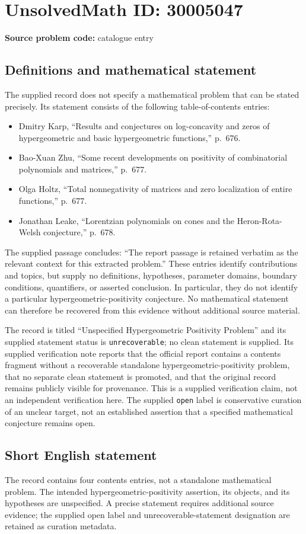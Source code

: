 \documentclass[11pt]{article}
\begin{document}
\section*{UnsolvedMath ID: 30005047}
\textbf{Source problem code:} catalogue entry
\subsection{Definitions and mathematical statement}
The supplied record does not specify a mathematical problem that can be stated precisely. Its statement consists of the following table-of-contents entries:
\begin{itemize}
\item Dmitry Karp, ``Results and conjectures on log-concavity and zeros of hypergeometric and basic hypergeometric functions,'' p.~676.
\item Bao-Xuan Zhu, ``Some recent developments on positivity of combinatorial polynomials and matrices,'' p.~677.
\item Olga Holtz, ``Total nonnegativity of matrices and zero localization of entire functions,'' p.~677.
\item Jonathan Leake, ``Lorentzian polynomials on cones and the Heron-Rota-Welsh conjecture,'' p.~678.
\end{itemize}
The supplied passage concludes: ``The report passage is retained verbatim as the relevant context for this extracted problem.'' These entries identify contributions and topics, but supply no definitions, hypotheses, parameter domains, boundary conditions, quantifiers, or asserted conclusion. In particular, they do not identify a particular hypergeometric-positivity conjecture. No mathematical statement can therefore be recovered from this evidence without additional source material.

The record is titled ``Unspecified Hypergeometric Positivity Problem'' and its supplied statement status is \texttt{unrecoverable}; no clean statement is supplied. Its supplied verification note reports that the official report contains a contents fragment without a recoverable standalone hypergeometric-positivity problem, that no separate clean statement is promoted, and that the original record remains publicly visible for provenance. This is a supplied verification claim, not an independent verification here. The supplied \texttt{open} label is conservative curation of an unclear target, not an established assertion that a specified mathematical conjecture remains open.
\subsection{Short English statement}
The record contains four contents entries, not a standalone mathematical problem. The intended hypergeometric-positivity assertion, its objects, and its hypotheses are unspecified. A precise statement requires additional source evidence; the supplied open label and unrecoverable-statement designation are retained as curation metadata.
\end{document}
